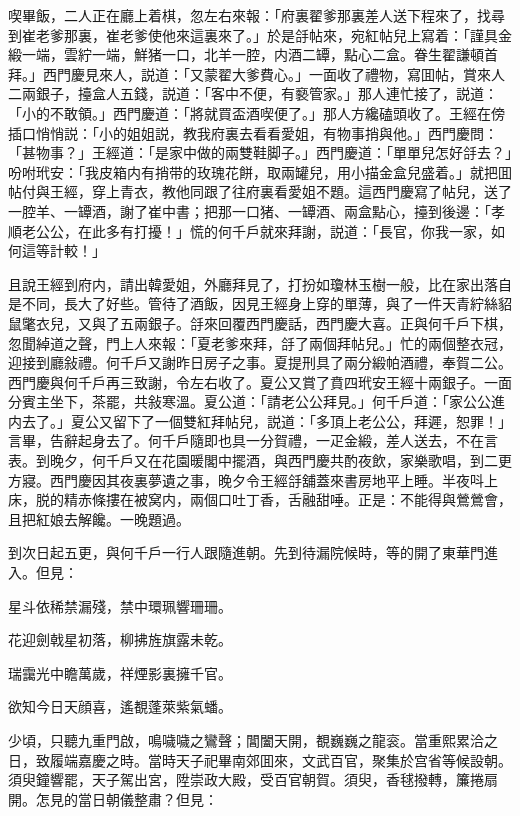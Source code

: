 喫畢飯，二人正在廳上着棋，忽左右來報：「府裏翟爹那裏差人送下程來了，找尋到崔老爹那裏，崔老爹使他來這裏來了。」於是㧱帖來，宛紅帖兒上寫着：「謹具金緞一端，雲紵一端，鮮猪一口，北羊一腔，内酒二罈，點心二盒。眷生翟謙頓首拜。」西門慶見來人，説道：「又蒙翟大爹費心。」一面收了禮物，寫囬帖，賞來人二兩銀子，擡盒人五錢，説道：「客中不便，有褻管家。」那人連忙接了，説道：「小的不敢領。」西門慶道：「將就買盃酒喫便了。」那人方纔磕頭收了。王經在傍插口悄悄説：「小的姐姐説，教我府裏去看看愛姐，有物事捎與他。」西門慶問：「甚物事？」王經道：「是家中做的兩雙鞋脚子。」西門慶道：「單單兒怎好㧱去？」吩咐玳安：「我皮箱内有捎带的玫瑰花餅，取兩罐兒，用小描金盒兒盛着。」就把囬帖付與王經，穿上青衣，教他同跟了往府裏看愛姐不題。這西門慶寫了帖兒，送了一腔羊、一罈酒，謝了崔中書；把那一口猪、一罈酒、兩盒點心，擡到後邊：「孝順老公公，在此多有打擾！」慌的何千戶就來拜謝，説道：「長官，你我一家，如何這等計較！」

且說王經到府内，請出韓愛姐，外廳拜見了，打扮如瓊林玉樹一般，比在家出落自是不同，長大了好些。管待了酒飯，因見王經身上穿的單薄，與了一件天青紵絲貂鼠氅衣兒，又與了五兩銀子。㧱來回覆西門慶話，西門慶大喜。正與何千戶下棋，忽聞綽道之聲，門上人來報：「夏老爹來拜，㧱了兩個拜帖兒。」忙的兩個整衣冠，迎接到廳敍禮。何千戶又謝昨日房子之事。夏提刑具了兩分緞帕酒禮，奉賀二公。西門慶與何千戶再三致謝，令左右收了。夏公又賞了賁四玳安王經十兩銀子。一面分賓主坐下，茶罷，共敍寒溫。夏公道：「請老公公拜見。」何千戶道：「家公公進内去了。」夏公又留下了一個雙紅拜帖兒，説道：「多頂上老公公，拜遲，恕罪！」言畢，告辭起身去了。何千戶隨即也具一分賀禮，一疋金緞，差人送去，不在言表。到晚夕，何千戶又在花園暖閣中擺酒，與西門慶共酌夜飲，家樂歌唱，到二更方寢。西門慶因其夜裏夢遺之事，晚夕令王經㧱舖蓋來書房地平上睡。半夜呌上床，脱的精赤條摟在被窝内，兩個口吐丁香，舌融甜唾。正是：不能得與鶯鶯會，且把紅娘去解饞。一晚題過。

到次日起五更，與何千戶一行人跟隨進朝。先到待漏院候時，等的開了東華門進入。但見：

\begin{myquote}
星斗依稀禁漏殘，禁中環珮響珊珊。

花迎劍戟星初落，柳拂旌旗露未乾。

瑞靄光中瞻萬歲，祥煙影裏擁千官。

欲知今日天顔喜，遙覩蓬萊紫氣蟠。
\end{myquote}

少頃，只聽九重門啟，鳴噦噦之鸞聲；閶闔天開，覩巍巍之龍衮。當重熙累洽之日，致履端嘉慶之時。當時天子祀畢南郊囬來，文武百官，聚集於宫省等候設朝。須臾鐘響罷，天子駕出宮，陞崇政大殿，受百官朝賀。須臾，香毬撥轉，簾捲扇開。怎見的當日朝儀整肅？但見：

